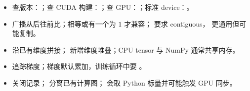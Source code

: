 \begin{quickcard}\begin{itemize}
  \item 查版本：；查 CUDA 构建：；查 GPU：；标准 device：。
  \item 广播从后往前比；相等或有一个为 $1$ 才兼容； 要求 contiguous， 更通用但可能复制。
  \item {} 沿已有维度拼接； 新增维度堆叠；CPU tensor 与 NumPy 通常共享内存。
  \item {} 追踪梯度；梯度默认累加，训练循环中要 。
  \item {} 关闭记录； 分离已有计算图； 会取 Python 标量并可能触发 GPU 同步。
\end{itemize}\end{quickcard}
